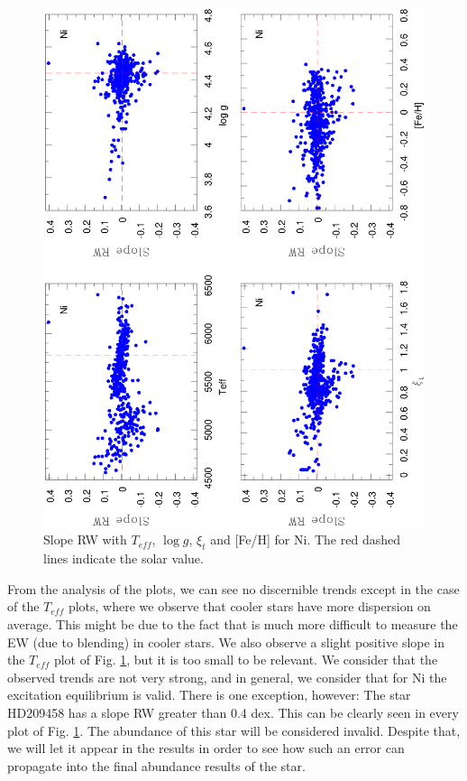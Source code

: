 \documentclass[dvips,12pt,a4paper]{report}
\begin{document}
{{\begin{figure}[h!]
\centering
\includegraphics[angle=-90, trim=8mm 10mm 5mm 10mm, clip,width=12 cm]{pics/parte3/RW.eps}
\caption[Slope RW with the stellar parameters for Ni]{Slope RW with $T_{eff}$, $\log g$, $\xi_t$ and [Fe/H] for Ni. The red dashed lines indicate the solar value.}
\label{slopeRW}
\end{figure}

From the analysis of the plots, we can see no discernible trends except in the case of the $T_{eff}$ plots, where we observe that cooler stars  have more dispersion on average. This might be due to the fact that is much more difficult to measure the EW (due to blending) in cooler stars. We also observe a slight positive slope in the $T_{eff}$ plot of Fig. \ref{slopeRW}, but it is too small to be relevant. We consider that the observed trends are not very strong, and in general, we consider that for Ni the excitation equilibrium is valid. There is one exception, however: The star HD209458 has a slope RW greater than 0.4 dex. This can be clearly seen in every plot of Fig. \ref{slopeRW}. The abundance of this star will be considered invalid. Despite that, we will let it appear in the results in order to see how such an error can propagate into the final abundance results of the star.





}}
\end{document}
